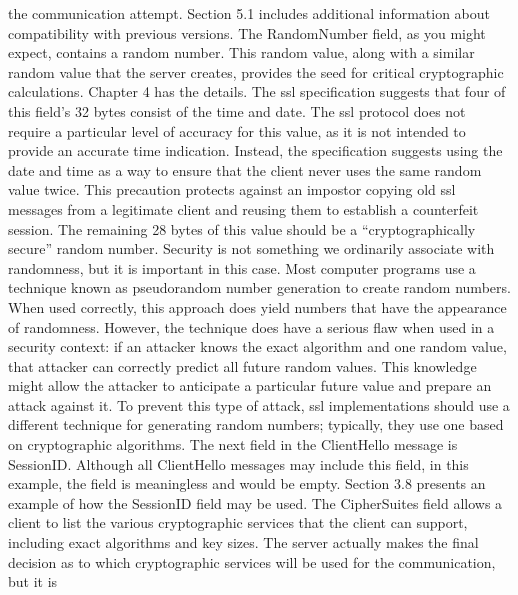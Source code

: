 the communication attempt. Section 5.1 includes additional information about compatibility with previous versions.
The RandomNumber field, as you might expect, contains a random
number. This random value, along with a similar random value that
the server creates, provides the seed for critical cryptographic calculations. Chapter 4 has the details. The ssl specification suggests that
four of this field’s 32 bytes consist of the time and date. The ssl protocol does not require a particular level of accuracy for this value, as it
is not intended to provide an accurate time indication. Instead, the
specification suggests using the date and time as a way to ensure that
the client never uses the same random value twice. This precaution
protects against an impostor copying old ssl messages from a legitimate client and reusing them to establish a counterfeit session.
The remaining 28 bytes of this value should be a “cryptographically
secure” random number. Security is not something we ordinarily associate with randomness, but it is important in this case. Most computer programs use a technique known as pseudorandom number
generation to create random numbers. When used correctly, this approach does yield numbers that have the appearance of randomness.
However, the technique does have a serious flaw when used in a security context: if an attacker knows the exact algorithm and one random value, that attacker can correctly predict all future random
values. This knowledge might allow the attacker to anticipate a particular future value and prepare an attack against it. To prevent this
type of attack, ssl implementations should use a different technique
for generating random numbers; typically, they use one based on
cryptographic algorithms.
The next field in the ClientHello message is SessionID. Although all
ClientHello messages may include this field, in this example, the
field is meaningless and would be empty. Section 3.8 presents an example of how the SessionID field may be used.
The CipherSuites field allows a client to list the various cryptographic
services that the client can support, including exact algorithms and
key sizes. The server actually makes the final decision as to which
cryptographic services will be used for the communication, but it is

